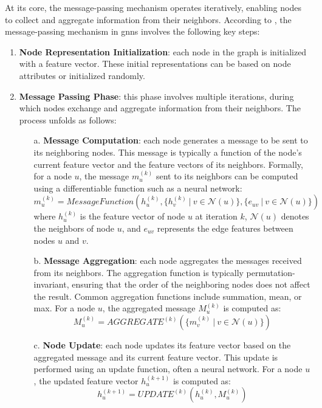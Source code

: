 At its core, the message-passing mechanism operates iteratively, enabling nodes to collect and aggregate information from their neighbors.
According to \cite{Khemani2024}, the message-passing mechanism in \glspl{gnn} involves the following key steps:
\begin{enumerate}
    \item \textbf{Node Representation Initialization}: each node in the graph is initialized with a feature vector. These initial representations can be based on node attributes or initialized randomly.

    \item \textbf{Message Passing Phase}: this phase involves multiple iterations, during which nodes exchange and aggregate information from their neighbors. The process unfolds as follows:
    \begin{itemize}
        \item[a.] \textbf{Message Computation}: each node generates a message to be sent to its neighboring nodes. This message is typically a function of the node's current feature vector and the feature vectors of its neighbors. Formally, for a node \(u\), the message \(m_{u}^{(k)}\) sent to its neighbors can be computed using a differentiable function such as a neural network:
        \[
        m_{u}^{(k)} = MessageFunction(h_u^{(k)}, \{h_v^{(k)}~|~v \in \mathcal{N}(u)\}, \{e_{uv}~|~v \in \mathcal{N}(u)\})
        \]
        where \(h_u^{(k)}\) is the feature vector of node \(u\) at iteration \(k\), \(\mathcal{N}(u)\) denotes the neighbors of node \(u\), and \(e_{uv}\) represents the edge features between nodes \(u\) and \(v\).
  
        \item[b.] \textbf{Message Aggregation}: each node aggregates the messages received from its neighbors. The aggregation function is typically permutation-invariant, ensuring that the order of the neighboring nodes does not affect the result. Common aggregation functions include summation, mean, or max. For a node \(u\), the aggregated message \(M_u^{(k)}\) is computed as:
        \[
        M_u^{(k)} = AGGREGATE^{(k)}(\{m_{v}^{(k)}~|~v \in \mathcal{N}(u)\})
        \]
  
        \item[c.] \textbf{Node Update}: each node updates its feature vector based on the aggregated message and its current feature vector. This update is performed using an update function, often a neural network. For a node \(u\), the updated feature vector \(h_u^{(k+1)}\) is computed as:
        \[
        h_u^{(k+1)} = UPDATE^{(k)}(h_u^{(k)}, M_u^{(k)})
        \]
    \end{itemize}


\end{enumerate}
